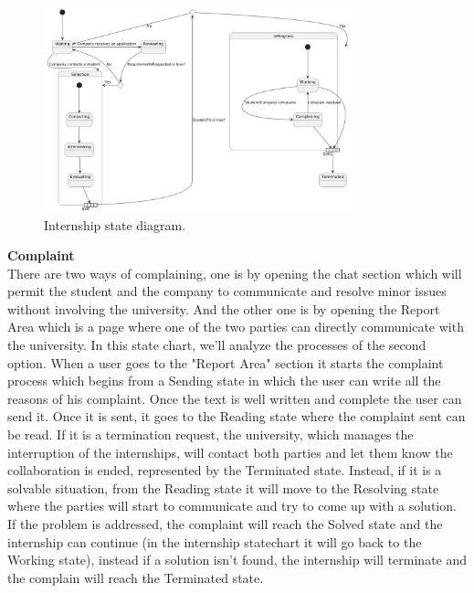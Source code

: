 \begin{figure}[H]
        \centering
        \includegraphics[width=0.8\textwidth]{Assets/Statecharts/Internship_SC.png}
        \caption{Internship state diagram.}
        \label{fig:Internship state diagram.}
    \end{figure}
\textbf{Complaint}\\
There are two ways of complaining, one is by opening the chat section which will permit the student and the company to communicate and resolve minor issues without involving the university. And the other one is by opening the Report Area which is a page where one of the two parties can directly communicate with the university. In this state chart, we'll analyze the processes of the second option.
When a user goes to the "Report Area" section it starts the complaint process which begins from a Sending state in which the user can write all the reasons of his complaint. Once the text is well written and complete the user can send it. Once it is sent, it goes to the Reading state where the complaint sent can be read. If it is a termination request, the university, which manages the interruption of the internships, will contact both parties and let them know the collaboration is ended, represented by the Terminated state. Instead, if it is a solvable situation, from the Reading state it will move to the Resolving state where the parties will start to communicate and try to come up with a solution. If the problem is addressed, the complaint will reach the Solved state and the internship can continue (in the internship statechart it will go back to the Working state), instead if a solution isn't found, the internship will terminate and the complain will reach the Terminated state.\\
